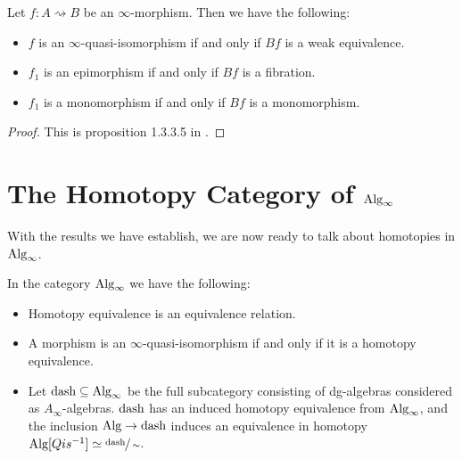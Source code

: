 \documentclass[../thesis.tex]{subfiles}
\begin{document}
        \begin{proposition}\label{prop: coherent-model-structure}
            Let $f : A \rightsquigarrow B$ be an $\infty$-morphism. Then we have the following:
            \begin{itemize}
                \item $f$ is an $\infty$-quasi-isomorphism if and only if $Bf$ is a weak equivalence.
                \item $f_1$ is an epimorphism if and only if $Bf$ is a fibration.
                \item $f_1$ is a monomorphism if and only if $Bf$ is a monomorphism.
            \end{itemize}
        \end{proposition}

        \begin{proof}
            This is proposition 1.3.3.5 in \cite{LefevreHasegawa03}.
        \end{proof}

    \section{The Homotopy Category of $\tt{Alg}_\infty$}

    With the results we have establish, we are now ready to talk about homotopies in $\tt{Alg}_\infty$.

    \begin{thm}\label{thm: model-Alg-inf}
        In the category $\tt{Alg}_\infty$ we have the following:
        \begin{itemize}
            \item Homotopy equivalence is an equivalence relation.
            \item A morphism is an $\infty$-quasi-isomorphism if and only if it is a homotopy equivalence.
            \item Let $\tt{dash} \subseteq \tt{Alg}_\infty$ be the full subcategory consisting of dg-algebras considered as $A_\infty$-algebras. $\tt{dash}$ has an induced homotopy equivalence from $\tt{Alg}_\infty$, and the inclusion $\tt{Alg} \rightarrow \tt{dash}$ induces an equivalence in homotopy $\tt{Alg}[Qis^{-1}] \simeq \sfrac{\tt{dash}}{\sim}$.
        \end{itemize}
    \end{thm}
\end{document}
